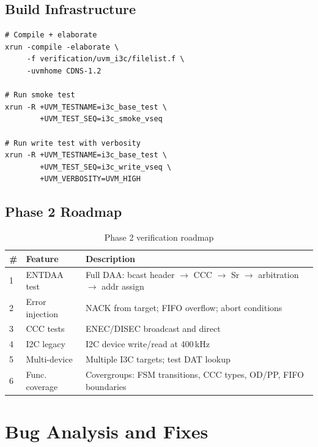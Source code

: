 \documentclass[12pt, a4paper, oneside]{report}
\begin{document}
\section{Build Infrastructure}

\begin{lstlisting}[style=plain, caption={Xcelium build and run commands}]
# Compile + elaborate
xrun -compile -elaborate \
     -f verification/uvm_i3c/filelist.f \
     -uvmhome CDNS-1.2

# Run smoke test
xrun -R +UVM_TESTNAME=i3c_base_test \
        +UVM_TEST_SEQ=i3c_smoke_vseq

# Run write test with verbosity
xrun -R +UVM_TESTNAME=i3c_base_test \
        +UVM_TEST_SEQ=i3c_write_vseq \
        +UVM_VERBOSITY=UVM_HIGH
\end{lstlisting}

\section{Phase 2 Roadmap}

\begin{table}[H]
\centering
\caption{Phase 2 verification roadmap}
\label{tab:phase2}
\begin{tabularx}{\textwidth}{C{0.5cm} L{3cm} L{8.5cm}}
\toprule
\textbf{\#} & \textbf{Feature} & \textbf{Description} \\
\midrule
1 & ENTDAA test    & Full DAA: bcast header $\rightarrow$ CCC $\rightarrow$ Sr $\rightarrow$ arbitration $\rightarrow$ addr assign \\
2 & Error injection & NACK from target; FIFO overflow; abort conditions \\
3 & CCC tests      & ENEC/DISEC broadcast and direct \\
4 & I2C legacy     & I2C device write/read at 400\,kHz \\
5 & Multi-device   & Multiple I3C targets; test DAT lookup \\
6 & Func. coverage & Covergroups: FSM transitions, CCC types, OD/PP, FIFO boundaries \\
\bottomrule
\end{tabularx}
\end{table}

\chapter{Bug Analysis and Fixes}
\end{document}
